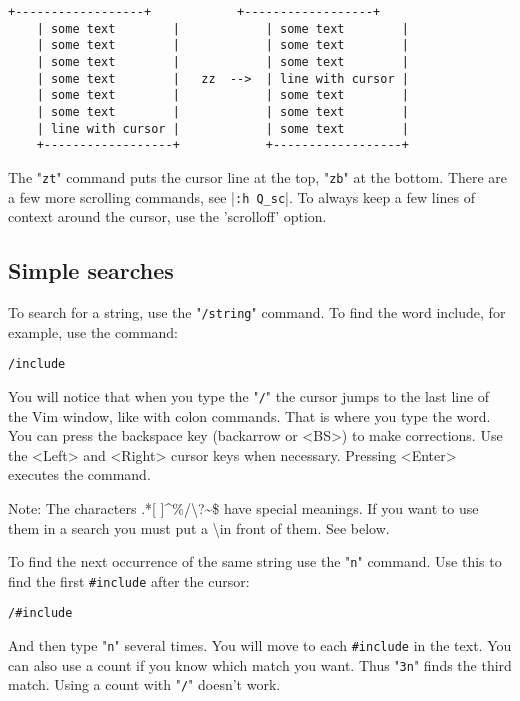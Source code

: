 \begin{Verbatim}[samepage=true]
    +------------------+            +------------------+
    | some text        |            | some text        |
    | some text        |            | some text        |
    | some text        |            | some text        |
    | some text        |   zz  -->  | line with cursor |
    | some text        |            | some text        |
    | some text        |            | some text        |
    | line with cursor |            | some text        |
    +------------------+            +------------------+
\end{Verbatim}

The "\verb!zt!" command puts the cursor line at the top, "\verb!zb!" at the bottom.
There are a few more scrolling commands, see |\verb!:h Q_sc!|.
To always keep a few lines of context around the cursor, use the 'scrolloff' option.

\subsection{Simple searches}

To search for a string, use the "\verb!/string!" command.
To find the word include, for example, use the command:

 \begin{Verbatim}[samepage=true]
 /include
 \end{Verbatim}

You will notice that when you type the "\verb!/!" the cursor jumps to the last line of the Vim window, like with colon commands.
That is where you type the word.
You can press the backspace key (backarrow or <BS>) to make corrections.
Use the <Left> and <Right> cursor keys when necessary.
Pressing <Enter> executes the command.

Note:
The characters .*[ ]\textasciicircum\%/\textbackslash?\textasciitilde\$ have special meanings.
If you want to use them in a search you must put a \textbackslash in front of them.
See below.

To find the next occurrence of the same string use the "\verb!n!" command.
Use this to find the first \verb!#include! after the cursor:%

 \begin{Verbatim}[samepage=true]
 /#include
 \end{Verbatim}

And then type "\verb!n!" several times.
You will move to each \verb!#include! in the text.
You can also use a count if you know which match you want.
Thus "\verb!3n!" finds the third match.
Using a count with "\verb!/!" doesn't work.

